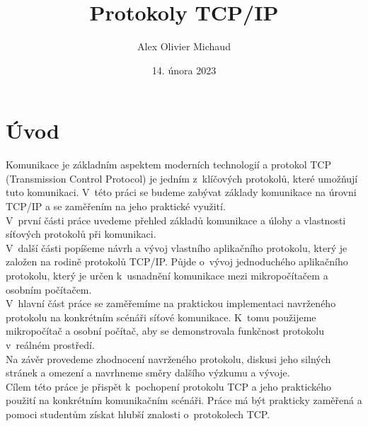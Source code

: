 \documentclass[12pt]{report}			%
\author{Alex Olivier Michaud}
\title{Protokoly TCP/IP}
\date{14. února 2023}
\begin{document}
	\mytitlepage						%
	
	
	
	
   {\tableofcontents\newpage}			%
	
\addtocounter{page}{1}		%
	\chapter*{Úvod}
	
	Komunikace je základním aspektem moderních technologií a protokol TCP (Transmission Control Protocol) je jedním z~klíčových protokolů, které umožňují tuto komunikaci. V~této práci se budeme zabývat základy komunikace na úrovni TCP/IP a se zaměřením na jeho praktické využití.
\\
V~první části práce uvedeme přehled základů komunikace a úlohy a vlastnosti síťových protokolů při komunikaci.
\\
V~další části popíšeme návrh a vývoj vlastního aplikačního protokolu, který je založen na rodině protokolů TCP/IP. Půjde o~vývoj jednoduchého aplikačního protokolu, který je určen k~usnadnění komunikace mezi mikropočítačem a osobním počítačem.
\\
V~hlavní část práce se zaměřemíme na praktickou implementaci navrženého protokolu na konkrétním scénáři síťové komunikace. K~tomu použijeme mikropočítač a osobní počítač, aby se demonstrovala funkčnost protokolu v~reálném prostředí.
\\
Na závěr provedeme zhodnocení navrženého protokolu, diskusi jeho silných stránek a omezení a navrhneme směry dalšího výzkumu a vývoje.
\\
Cílem této práce je přispět k~pochopení protokolu TCP a jeho praktického použití na konkrétním komunikačním scénáři. Práce má být prakticky zaměřená a pomoci studentům získat hlubší znalosti o~protokolech TCP.	
	
\end{document}
